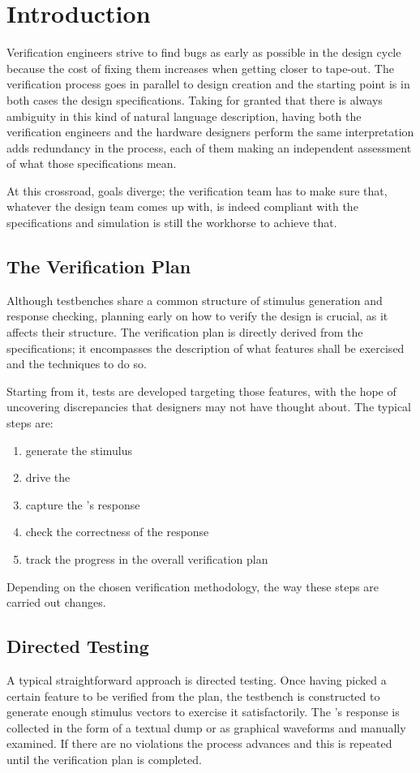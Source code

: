 \section{Introduction}\label{sec:introduction}
Verification engineers strive to find bugs as early as possible in the design cycle because the cost of fixing them increases when getting closer to tape-out.
The verification process goes in parallel to design creation and the starting point is in both cases the design specifications. Taking for granted that there is always ambiguity in this kind of natural language description, having both the verification engineers and the hardware designers perform the same interpretation adds redundancy in the process, each of them making an independent assessment of what those specifications mean. 

At this crossroad, goals diverge; the verification team has to make sure that, whatever the design team comes up with, is indeed compliant with the specifications and simulation is still the workhorse to achieve that.

\subsection{The Verification Plan}\label{subsec:verification-plan}
Although testbenches share a common structure of stimulus generation and response checking, planning early on how to verify the design is crucial, as it affects their structure. The verification plan is directly derived from the specifications; it encompasses the description of what features shall be exercised and the techniques to do so.

Starting from it, tests are developed targeting those features, with the hope of uncovering discrepancies that designers may not have thought about. The typical steps are:
\begin{enumerate}
    \item generate the stimulus
    \item drive the \dut
    \item capture the \dut's response
    \item check the correctness of the response
    \item track the progress in the overall verification plan
\end{enumerate}
Depending on the chosen verification methodology, the way these steps are carried out changes.

\subsection{Directed Testing}\label{subsec:direct-testing}
A typical straightforward approach is directed testing. Once having picked a certain feature to be verified from the plan, the testbench is constructed to generate enough stimulus vectors to exercise it satisfactorily. The \dut's response is collected in the form of a textual dump or as graphical waveforms and manually examined. If there are no violations the process advances and this is repeated until the verification plan is completed. 

